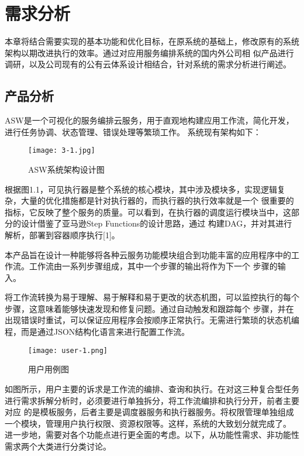 
\chapter{需求分析}
本章将结合需要实现的基本功能和优化目标，在原系统的基础上，修改原有的系统架构以期改进执行的效率。通过对应用服务编排系统的国内外公司相
似产品进行调研，以及公司现有的公有云体系设计相结合，针对系统的需求分析进行阐述。

\section{产品分析}
ASW是一个可视化的服务编排云服务，用于直观地构建应用工作流，简化开发，进行任务协调、状态管理、错误处理等繁琐工作。
系统现有架构如下：

\begin{figure}[h]
    \centering
    \texttt{[image: 3-1.jpg]}
    \caption{ASW系统架构设计图}
    \label{fig:xtjg}
\end{figure}

根据图1.1，可见执行器是整个系统的核心模块，其中涉及模块多，实现逻辑复杂，大量的优化措施都是针对执行器的，而执行器的执行效率就是一个
很重要的指标，它反映了整个服务的质量。可以看到，在执行器的调度运行模块当中，这部分的设计借鉴了亚马逊Step Functions的设计思路，通过
构建DAG，并对其进行解析，部署到容器顺序执行[1]。

本产品旨在设计一种能够将各种云服务功能模块组合到功能丰富的应用程序中的工作流。工作流由一系列步骤组成，其中一个步骤的输出将作为下一个
步骤的输入。

将工作流转换为易于理解、易于解释和易于更改的状态机图，可以监控执行的每个步骤，这意味着能够快速发现和修复问题。通过自动触发和跟踪每个
步骤，并在出现错误时重试，可以保证应用程序会按顺序正常执行。无需进行繁琐的状态机编程，而是通过JSON结构化语言来进行配置工作流。

\begin{figure}[H]
    \centering
    \texttt{[image: user-1.png]}
    \caption{用户用例图}
    \label{fig:yhyl}
\end{figure}

如图所示，用户主要的诉求是工作流的编排、查询和执行。在对这三种复合型任务进行需求拆解分析时，必须要进行单独拆分，将工作流编排和执行分开，前者主要对应
的是模板服务，后者主要是调度器服务和执行器服务。将权限管理单独组成一个模块，管理用户执行权限、资源权限等。这样，系统的大致划分就完成了。
进一步地，需要对各个功能点进行更全面的考虑。以下，从功能性需求、非功能性需求两个大类进行分类讨论。

